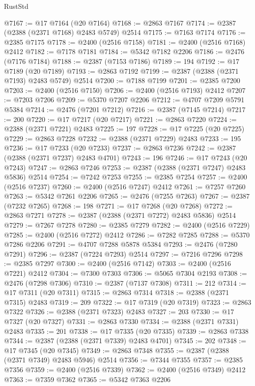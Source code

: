 \begin{lexlean}{RustStd}
\begin{coremodule}
@7167 := @17 @7164 (@20 @7164)
@7168 := @2863 @7167
@7174 := @2387 (@2388 (@2371 @7168) @2483 @5749) @2514
@7175 := @7163 @7174
@7176 := @2385 @7175
@7178 := @2400 (@2516 @7158)
@7181 := @2400 (@2516 @7168) @2412
@7182 := @7178 @7181
@7184 := @5342 @7182 @2206
@7186 := @2476 (@7176 @7184)
@7188 := @2387 (@7153 @7186)
@7189 := 194
@7192 := @17 @7189 (@20 @7189)
@7193 := @2863 @7192
@7199 := @2387 (@2388 (@2371 @7193) @2483 @5749) @2514
@7200 := @7188 @7199
@7201 := @2385 @7200
@7203 := @2400 (@2516 @7150)
@7206 := @2400 (@2516 @7193) @2412
@7207 := @7203 @7206
@7209 := @5370 @7207 @2206
@7212 := @4707 @7209 @5791 @5384
@7214 := @2476 (@7201 @7212)
@7216 := @2387 (@7145 @7214)
@7217 := 200
@7220 := @17 @7217 (@20 @7217)
@7221 := @2863 @7220
@7224 := @2388 (@2371 @7221) @2483
@7225 := 197
@7228 := @17 @7225 (@20 @7225)
@7229 := @2863 @7228
@7232 := @2388 (@2371 @7229) @2483
@7233 := 195
@7236 := @17 @7233 (@20 @7233)
@7237 := @2863 @7236
@7242 := @2387 (@2388 (@2371 @7237) @2483 @4701)
@7243 := 196
@7246 := @17 @7243 (@20 @7243)
@7247 := @2863 @7246
@7253 := @2387 (@2388 (@2371 @7247) @2483 @5836) @2514
@7254 := @7242 @7253
@7255 := @2385 @7254
@7257 := @2400 (@2516 @7237)
@7260 := @2400 (@2516 @7247) @2412
@7261 := @7257 @7260
@7263 := @5342 @7261 @2206
@7265 := @2476 (@7255 @7263)
@7267 := @2387 (@7232 @7265)
@7268 := 198
@7271 := @17 @7268 (@20 @7268)
@7272 := @2863 @7271
@7278 := @2387 (@2388 (@2371 @7272) @2483 @5836) @2514
@7279 := @7267 @7278
@7280 := @2385 @7279
@7282 := @2400 (@2516 @7229)
@7285 := @2400 (@2516 @7272) @2412
@7286 := @7282 @7285
@7288 := @5370 @7286 @2206
@7291 := @4707 @7288 @5878 @5384
@7293 := @2476 (@7280 @7291)
@7296 := @2387 (@7224 @7293) @2514
@7297 := @7216 @7296
@7298 := @2385 @7297
@7300 := @2400 (@2516 @7142)
@7303 := @2400 (@2516 @7221) @2412
@7304 := @7300 @7303
@7306 := @5065 @7304 @2193
@7308 := @2476 (@7298 @7306)
@7310 := @2387 (@7137 @7308)
@7311 := 212
@7314 := @17 @7311 (@20 @7311)
@7315 := @2863 @7314
@7318 := @2388 (@2371 @7315) @2483
@7319 := 209
@7322 := @17 @7319 (@20 @7319)
@7323 := @2863 @7322
@7326 := @2388 (@2371 @7323) @2483
@7327 := 203
@7330 := @17 @7327 (@20 @7327)
@7331 := @2863 @7330
@7334 := @2388 (@2371 @7331) @2483
@7335 := 201
@7338 := @17 @7335 (@20 @7335)
@7339 := @2863 @7338
@7344 := @2387 (@2388 (@2371 @7339) @2483 @4701)
@7345 := 202
@7348 := @17 @7345 (@20 @7345)
@7349 := @2863 @7348
@7355 := @2387 (@2388 (@2371 @7349) @2483 @5946) @2514
@7356 := @7344 @7355
@7357 := @2385 @7356
@7359 := @2400 (@2516 @7339)
@7362 := @2400 (@2516 @7349) @2412
@7363 := @7359 @7362
@7365 := @5342 @7363 @2206

\end{coremodule}
\end{lexlean}
